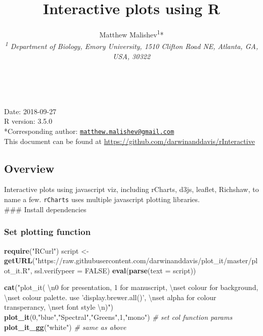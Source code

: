 \documentclass[10,portrait]{article}
\title{Interactive plots using R}
\author{Matthew Malishev\textsuperscript{1}*\\
\emph{\textsuperscript{1} Department of Biology, Emory University, 1510
Clifton Road NE, Atlanta, GA, USA, 30322}}
\date{}
\newenvironment{Shaded}{\begin{snugshade}}{\end{snugshade}}
\newcommand{\KeywordTok}[1]{\textcolor[rgb]{0.13,0.29,0.53}{\textbf{#1}}}
\newcommand{\DataTypeTok}[1]{\textcolor[rgb]{0.13,0.29,0.53}{#1}}
\newcommand{\DecValTok}[1]{\textcolor[rgb]{0.00,0.00,0.81}{#1}}
\newcommand{\CharTok}[1]{\textcolor[rgb]{0.31,0.60,0.02}{#1}}
\newcommand{\StringTok}[1]{\textcolor[rgb]{0.31,0.60,0.02}{#1}}
\newcommand{\CommentTok}[1]{\textcolor[rgb]{0.56,0.35,0.01}{\textit{#1}}}
\newcommand{\OtherTok}[1]{\textcolor[rgb]{0.56,0.35,0.01}{#1}}
\newcommand{\NormalTok}[1]{#1}
\begin{document}
\maketitle

{
\hypersetup{linkcolor=black}
\setcounter{tocdepth}{4}
\tableofcontents
}
~

Date: 2018-09-27\\
R version: 3.5.0\\
*Corresponding author:
\href{mailto:matthew.malishev@gmail.com}{\nolinkurl{matthew.malishev@gmail.com}}\\
This document can be found at
\url{https://github.com/darwinanddavis/rInteractive}

\newpage  

\subsection{Overview}\label{overview}

Interactive plots using javascript viz, including rCharts, d3js,
leaflet, Richshaw, to name a few. \texttt{rCharts} uses multiple
javascript plotting libraries.\\
\#\#\# Install dependencies

\subsubsection{Set plotting function}\label{set-plotting-function}

\begin{Shaded}
\begin{Highlighting}[]
\KeywordTok{require}\NormalTok{(}\StringTok{"RCurl"}\NormalTok{)}
\NormalTok{script <-}\StringTok{ }\KeywordTok{getURL}\NormalTok{(}\StringTok{"https://raw.githubusercontent.com/darwinanddavis/plot_it/master/plot_it.R"}\NormalTok{, }\DataTypeTok{ssl.verifypeer =} \OtherTok{FALSE}\NormalTok{)}
\KeywordTok{eval}\NormalTok{(}\KeywordTok{parse}\NormalTok{(}\DataTypeTok{text =}\NormalTok{ script))}

\KeywordTok{cat}\NormalTok{(}\StringTok{"plot_it( }\CharTok{\textbackslash{}n}\StringTok{0 for presentation, 1 for manuscript, }\CharTok{\textbackslash{}n}\StringTok{set colour for background, }\CharTok{\textbackslash{}n}\StringTok{set colour palette. use 'display.brewer.all()', }\CharTok{\textbackslash{}n}\StringTok{set alpha for colour transperancy, }\CharTok{\textbackslash{}n}\StringTok{set font style }\CharTok{\textbackslash{}n}\StringTok{)"}\NormalTok{)}
\KeywordTok{plot_it}\NormalTok{(}\DecValTok{0}\NormalTok{,}\StringTok{"blue"}\NormalTok{,}\StringTok{"Spectral"}\NormalTok{,}\StringTok{"Greens"}\NormalTok{,}\DecValTok{1}\NormalTok{,}\StringTok{"mono"}\NormalTok{) }\CommentTok{# set col function params}
\KeywordTok{plot_it_gg}\NormalTok{(}\StringTok{"white"}\NormalTok{) }\CommentTok{# same as above }
\end{Highlighting}
\end{Shaded}
\end{document}
